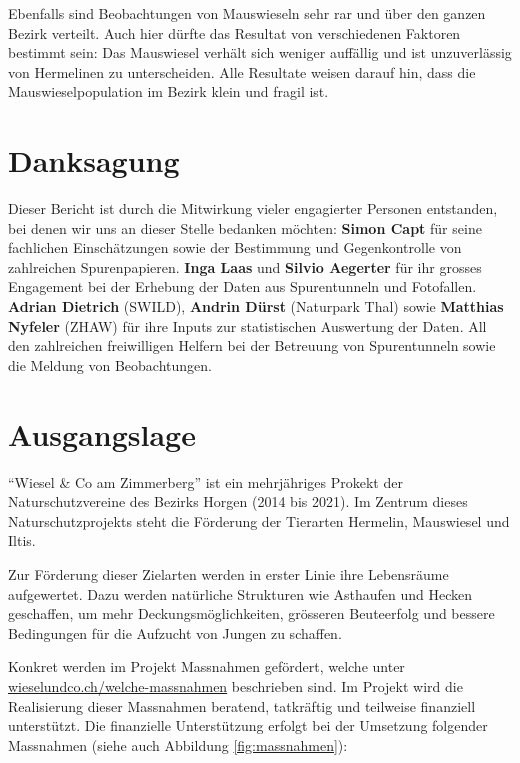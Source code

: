 \documentclass[
  oneside]{scrbook}
\begin{document}
Ebenfalls sind Beobachtungen von Mauswieseln sehr rar und über den ganzen Bezirk verteilt. Auch hier dürfte das Resultat von verschiedenen Faktoren bestimmt sein: Das Mauswiesel verhält sich weniger auffällig und ist unzuverlässig von Hermelinen zu unterscheiden. Alle Resultate weisen darauf hin, dass die Mauswieselpopulation im Bezirk klein und fragil ist.

\hypertarget{danksagung}{%
\chapter*{Danksagung}\label{danksagung}}

Dieser Bericht ist durch die Mitwirkung vieler engagierter Personen entstanden, bei denen wir uns an dieser Stelle bedanken möchten: \textbf{Simon Capt} für seine fachlichen Einschätzungen sowie der Bestimmung und Gegenkontrolle von zahlreichen Spurenpapieren. \textbf{Inga Laas} und \textbf{Silvio Aegerter} für ihr grosses Engagement bei der Erhebung der Daten aus Spurentunneln und Fotofallen. \textbf{Adrian Dietrich} (SWILD), \textbf{Andrin Dürst} (Naturpark Thal) sowie \textbf{Matthias Nyfeler} (ZHAW) für ihre Inputs zur statistischen Auswertung der Daten. All den zahlreichen freiwilligen Helfern bei der Betreuung von Spurentunneln sowie die Meldung von Beobachtungen.

\hypertarget{ausgangslage}{%
\chapter{Ausgangslage}\label{ausgangslage}}

``Wiesel \& Co am Zimmerberg'' ist ein mehrjähriges Prokekt der Naturschutzvereine des Bezirks Horgen (2014 bis 2021). Im Zentrum dieses Naturschutzprojekts steht die Förderung der Tierarten Hermelin, Mauswiesel und Iltis.

Zur Förderung dieser Zielarten werden in erster Linie ihre Lebensräume aufgewertet. Dazu werden natürliche Strukturen wie Asthaufen und Hecken geschaffen, um mehr Deckungsmöglichkeiten, grösseren Beuteerfolg und bessere Bedingungen für die Aufzucht von Jungen zu schaffen.

Konkret werden im Projekt Massnahmen gefördert, welche unter \href{https://wieselundco.ch/welche-massnahmen}{wieselundco.ch/welche-massnahmen} beschrieben sind. Im Projekt wird die Realisierung dieser Massnahmen beratend, tatkräftig und teilweise finanziell unterstützt. Die finanzielle Unterstützung erfolgt bei der Umsetzung folgender Massnahmen (siehe auch Abbildung \ref{fig:massnahmen}):
\end{document}
